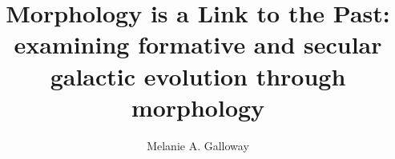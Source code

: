 \phd %

\title{\bf Morphology is a Link to the Past: examining formative and secular galactic evolution through morphology}
\author{Melanie A. Galloway}


\abstract{}
\copyrightpage %
\acknowledgements{}
\dedication{}


\beforepreface 


\afterpreface            
